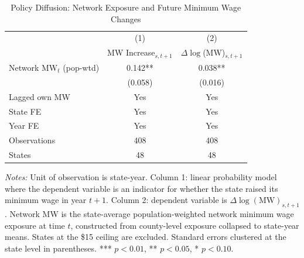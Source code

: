 \begin{table}[t]
\centering
\caption{Policy Diffusion: Network Exposure and Future Minimum Wage Changes}
\label{tab:diffusion}
\begin{threeparttable}
\begin{tabular}{lcc}
\toprule
 & (1) & (2) \\
 & MW Increase$_{s,t+1}$ & $\Delta\log$(MW)$_{s,t+1}$ \\
\midrule
Network MW$_t$ (pop-wtd) & 0.142** & 0.038** \\
 & (0.058) & (0.016) \\
\addlinespace
Lagged own MW & Yes & Yes \\
State FE & Yes & Yes \\
Year FE & Yes & Yes \\
Observations & 408 & 408 \\
States & 48 & 48 \\
\bottomrule
\end{tabular}
\begin{tablenotes}[flushleft]
\small
\item \textit{Notes:} Unit of observation is state-year. Column 1: linear probability model where the dependent variable is an indicator for whether the state raised its minimum wage in year $t+1$. Column 2: dependent variable is $\Delta\log(\text{MW})_{s,t+1}$. Network MW is the state-average population-weighted network minimum wage exposure at time $t$, constructed from county-level exposure collapsed to state-year means. States at the \$15 ceiling are excluded. Standard errors clustered at the state level in parentheses. *** $p<0.01$, ** $p<0.05$, * $p<0.10$.
\end{tablenotes}
\end{threeparttable}
\end{table}

